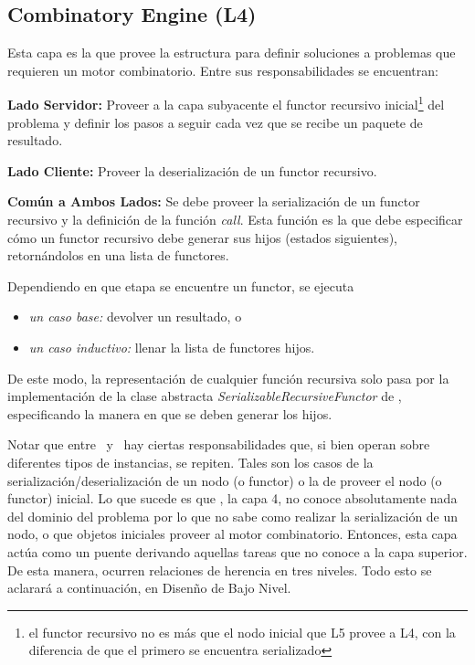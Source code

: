 	\newpage	
  \subsection{Combinatory Engine (L4)}
			Esta capa es la que provee la estructura para definir soluciones a problemas que requieren un motor combinatorio.\newline
			Entre sus responsabilidades se encuentran:
			\begin{description}
				\item \textbf{Lado Servidor:} Proveer a la capa subyacente el functor recursivo inicial\footnote{el functor recursivo no es m\'as que el nodo 
				inicial que L5 provee a L4, con la diferencia de que el primero se encuentra serializado} del problema y definir los pasos a seguir cada vez que 
				se recibe un paquete de resultado.
				
				\item \textbf{Lado Cliente:} Proveer la deserializaci\'on de un functor recursivo.
				\item \textbf{Com\'un a Ambos Lados:} Se debe proveer la serializaci\'on de un functor recursivo y la definici\'on de la funci\'on \textit{call}.
				Esta funci\'on es la que debe especificar c\'omo un functor recursivo debe generar sus hijos (estados siguientes), retorn\'andolos en una lista de 
				functores.
				
				Dependiendo en que etapa se encuentre un functor, se ejecuta
				\begin{itemize}
					\item \textit{un caso base:} devolver un resultado, o
					\item \textit{un caso inductivo:} llenar la lista de functores hijos.
				\end{itemize}
				De este modo, la representaci\'on de cualquier funci\'on recursiva solo pasa por la implementaci\'on de la clase abstracta 
        \emph{SerializableRecursiveFunctor} de \recabs, especificando la manera en que se deben generar los hijos.
			\end{description}

			Notar que entre \combeng \ y \recabs \ hay ciertas responsabilidades que, si bien operan sobre diferentes tipos de instancias, se repiten. Tales son 
			los casos de la serializaci\'on/deserializaci\'on de un nodo (o functor) o la de proveer el nodo (o functor) inicial. Lo que sucede es 
			que \combeng, la capa 4, no conoce absolutamente nada del dominio del problema por lo que no sabe como realizar la serializaci\'on de un nodo, o que 
			objetos iniciales proveer al motor combinatorio. Entonces, esta capa act\'ua como un puente derivando aquellas tareas que no conoce a la capa 
			superior. De esta manera, ocurren relaciones de herencia en tres niveles. Todo esto se aclarar\'a a continuaci\'on, en Disen\~no de Bajo Nivel.
			
